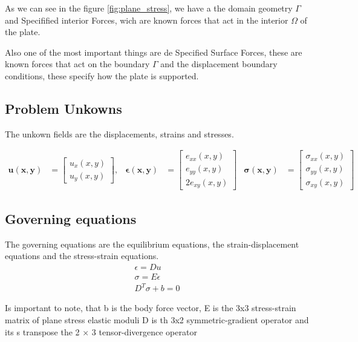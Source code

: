 \documentclass{article}  %
\begin{document}
As we can see in the figure \ref{fig:plane_stress}, we have a the domain geometry $\Gamma$ and Specifified interior Forces, wich are known forces that act in the interior $\Omega$ of the plate.

Also one of the most important things are de Specified Surface Forces, these are known forces that act on the boundary $\Gamma$ and the displacement boundary conditions, these specify how the plate is supported.

\subsection{Problem Unkowns}

The unkown fields are the displacements, strains and stresses. 

\begin{align}
  \mathbf{u(x,y)} &=
  \begin{bmatrix}
      u_x(x,y) \\
      u_y(x,y)
  \end{bmatrix},
  &
  \mathbf{\epsilon(x,y)} &=
  \begin{bmatrix}
      e_{xx}(x,y) \\
      e_{yy}(x,y) \\
      2e_{xy}(x,y)
  \end{bmatrix}
  &
  \mathbf{\sigma(x,y)} &=
  \begin{bmatrix}
      \sigma_{xx}(x,y) \\
      \sigma_{yy}(x,y) \\
      \sigma_{xy}(x,y)
  \end{bmatrix}
\end{align}

\subsection{Governing equations}
The governing equations are the equilibrium equations, the strain-displacement equations and the stress-strain equations.
\begin{align}
    \epsilon= Du \\
    \sigma = E \epsilon \\
    D^T \sigma +b =0
\end{align}

Is important to note, that b is the body force vector, E is the 3x3 stress-strain matrix of plane stress elastic moduli D is th 3x2 symmetric-gradient operator and its s transpose the 2 × 3 tensor-divergence operator
\end{document}
